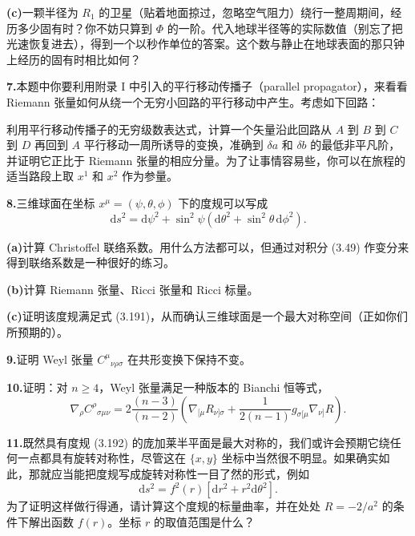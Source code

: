 \textbf{(c)}\quad 一颗半径为 $R_{1}$ 的卫星（贴着地面掠过，忽略空气阻力）绕行一整周期间，经历多少固有时？你不妨只算到 $\Phi$ 的一阶。代入地球半径等的实际数值（别忘了把光速恢复进去），得到一个以秒作单位的答案。这个数与静止在地球表面的那只钟上经历的固有时相比如何？

\textbf{7.}\quad 本题中你要利用附录 I 中引入的平行移动传播子（parallel propagator），来看看 Riemann 张量如何从绕一个无穷小回路的平行移动中产生。考虑如下回路：


利用平行移动传播子的无穷级数表达式，计算一个矢量沿此回路从 $A$ 到 $B$ 到 $C$ 到 $D$ 再回到 $A$ 平行移动一周所诱导的变换，准确到 $\delta a$ 和 $\delta b$ 的最低非平凡阶，并证明它正比于 Riemann 张量的相应分量。为了让事情容易些，你可以在旅程的适当路段上取 $x^{1}$ 和 $x^{2}$ 作为参量。

\textbf{8.}\quad 三维球面在坐标 $x^{\mu}=(\psi,\theta,\phi)$ 下的度规可以写成
\begin{equation*}
\mathrm{d}s^{2} = \mathrm{d}\psi^{2} + \sin^{2}\psi(\mathrm{d}\theta^{2} + \sin^{2}\theta\,\mathrm{d}\phi^{2}).
\tag{3.220}
\end{equation*}

\textbf{(a)}\quad 计算 Christoffel 联络系数。用什么方法都可以，但通过对积分 (3.49) 作变分来得到联络系数是一种很好的练习。

\textbf{(b)}\quad 计算 Riemann 张量、Ricci 张量和 Ricci 标量。

\textbf{(c)}\quad 证明该度规满足式 (3.191)，从而确认三维球面是一个最大对称空间（正如你们所预期的）。

\textbf{9.}\quad 证明 Weyl 张量 $C^{\mu}{}_{\nu\rho\sigma}$ 在共形变换下保持不变。

\textbf{10.}\quad 证明：对 $n\geq 4$，Weyl 张量满足一种版本的 Bianchi 恒等式，
\begin{equation*}
\nabla_{\rho}C^{\rho}{}_{\sigma\mu\nu} = 2\frac{(n-3)}{(n-2)}\left(\nabla_{[\mu}R_{\nu]\sigma} + \frac{1}{2(n-1)}g_{\sigma[\mu}\nabla_{\nu]}R\right).
\tag{3.221}
\end{equation*}

\textbf{11.}\quad 既然具有度规 (3.192) 的庞加莱半平面是最大对称的，我们或许会预期它绕任何一点都具有旋转对称性，尽管这在 $\{x,y\}$ 坐标中当然很不明显。如果确实如此，那就应当能把度规写成旋转对称性一目了然的形式，例如
\begin{equation*}
\mathrm{d}s^{2} = f^{2}(r)[\mathrm{d}r^{2} + r^{2}\mathrm{d}\theta^{2}].
\tag{3.222}
\end{equation*}
为了证明这样做行得通，请计算这个度规的标量曲率，并在处处 $R=-2/a^{2}$ 的条件下解出函数 $f(r)$。坐标 $r$ 的取值范围是什么？

